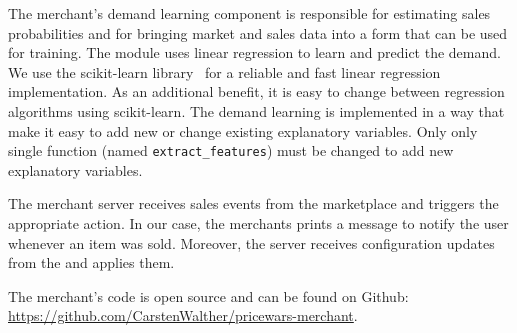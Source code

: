 The merchant's demand learning component is responsible for estimating sales probabilities and for bringing market and sales data into a form that can be used for training.
The module uses linear regression to learn and predict the demand.
We use the scikit-learn library~\cite{DBLP:journals/jmlr/PedregosaVGMTGBPWDVPCBPD11} for a reliable and fast linear regression implementation.
As an additional benefit, it is easy to change between regression algorithms using scikit-learn.
The demand learning is implemented in a way that make it easy to add new or change existing explanatory variables.
Only only single function (named \texttt{extract\_features}) must be changed to add new explanatory variables.

The merchant server receives sales events from the marketplace and triggers the appropriate action.
In our case, the merchants prints a message to notify the user whenever an item was sold.
Moreover, the server receives configuration updates from the \ui and applies them.  

The merchant's code is open source and can be found on Github: \url{https://github.com/CarstenWalther/pricewars-merchant}.

